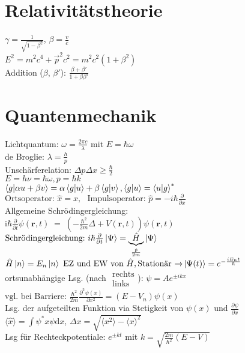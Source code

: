 \documentclass[a4paper, 11pt, fleqn]{article}
\renewcommand{\vec}{\overrightarrow}
\newcommand{\fpartial}[1]{\frac{\partial}{\partial #1}}
\newcommand{\ffpartial}[2]{\frac{\partial #1}{\partial #2}}
\begin{document}
\begin{multicols}{2}
\section{Relativitätstheorie}
$\gamma = \frac{1}{\sqrt{1 - \beta^2}}$, $\beta = \frac{v}{c}$\\
$E^2 = m^2 c^4 + \vec{p}^2 c^2 = m^2 c^2 (1 + \beta^2)$\\
Addition ($\beta$, $\beta'$): $\frac{\beta + \beta'}{1 + \beta \beta'}$

\section{Quantenmechanik}
Lichtquantum: $\omega = \frac{2 \pi c}{\lambda}$ mit $E = \hbar \omega$\\
de Broglie: $\lambda = \frac{h}{p}$\\
Unschärferelation: $\Delta p \Delta x \geq \frac{\hbar}{2}$\\
$E = h \nu = \hbar \omega, p = \hbar k$\\
$\braket{g | \alpha u + \beta v} = \alpha \braket{g | u} + \beta \braket{g | v}, \braket{g | u} = \braket{u | g}^\ast$\\
$\text{Ortsoperator:~} \hat{x} = x, \text{~~Impulsoperator:~} \hat{p} = -i \hbar \fpartial{x}$\\
Allgemeine Schrödingergleichung:\\
 $\mathrm i\hbar\frac{\partial}{\partial t}\psi(\mathbf{r},t) \;=\; \left(- \frac{\hbar^2}{2m}\Delta + V(\mathbf{r},t)\right)\psi(\mathbf{r},t)$\\
$\text{Schrödingergleichung:~} i\hbar \fpartial{t} \ket{\Psi} = \underbrace{\hat{H}}_{\frac{\hat{p}}{2m}} \ket{\Psi}$\\
$\hat{H} \ket{n} = E_n \ket{n} \text{~EZ und EW von $\hat{H}$}, \text{Stationär $\rightarrow$} \ket{\Psi(t)} = e^{-\frac{i E_n t}{\hbar}}$\\
ortsunabhängige Lsg. (nach $\substack{\text{rechts}\\\text{links}}$): $\psi = A e^{\pm i k x}$\\
$\text{vgl. bei Barriere:~} \frac{\hbar^2}{2m}\frac{\partial^2 \psi(x)}{\partial x^2} = (E - V_n) \psi(x)$\\
Lsg. der aufgeteilten Funktion via Stetigkeit von $\psi(x)$ und $\ffpartial{\psi}{x}$\\
$\langle \hat{x} \rangle = \int \psi^\ast x \psi \mathrm{d} x$, $\Delta x = \sqrt{\langle x^2 \rangle - \langle x \rangle^2}$\\
Lsg für Rechteckpotentiale: $e^{\pm kt}$ mit $k= \sqrt{\frac{2m}{\hbar^2}(E-V)}$


\end{multicols}
\end{document}
